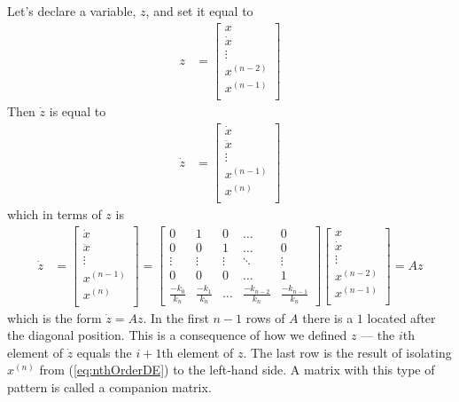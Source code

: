 \documentclass[11pt, oneside]{article}   	%
\begin{document}
Let's declare a variable, $z$, and set it equal to
\begin{align}
z &= \begin{bmatrix}
        x \\
        \dot{x} \\
        \vdots \\
        x^{(n-2)} \\
        x^{(n-1)} \\
      \end{bmatrix}
\end{align}
Then $\dot{z}$ is equal to
\begin{align}
\dot{z} &= \begin{bmatrix}
        \dot{x} \\
        \ddot{x} \\
        \vdots \\
        x^{(n-1)} \\
        x^{(n)} \\
      \end{bmatrix}
\end{align}
which in terms of $z$ is
\begin{align}
\dot{z} &= \begin{bmatrix}
        \dot{x} \\
        \ddot{x} \\
        \vdots \\
        x^{(n-1)} \\
        x^{(n)} \\
      \end{bmatrix}
  =
      \begin{bmatrix}
        0 & 1 & 0 & \dots & 0 \\
        0 & 0 & 1 & \dots & 0 \\
        \vdots & \vdots & \vdots & \ddots & \vdots \\
        0 & 0 & 0 & \dots & 1 \\
        \frac{-k_0}{k_n} & \frac{-k_1}{k_n} & \dots & \frac{-k_{n-2}}{k_n} & \frac{-k_{n-1}}{k_n}
      \end{bmatrix}
      \begin{bmatrix}
        x \\
        \dot{x} \\
        \vdots \\
        x^{(n-2)} \\
        x^{(n-1)} \\
      \end{bmatrix}
  = Az
\end{align}
which is the form $\dot{z} = Az$.
In the first $n-1$ rows of $A$ there is a $1$ located after the diagonal position.
This is a consequence of how we defined $z$ --- the $i$th element of $\dot{z}$ equals the $i+1$th element of $z$.
The last row is the result of isolating $x^{(n)}$ from (\ref*{eq:nthOrderDE}) to the left-hand side.
A matrix with this type of pattern is called a companion matrix.
\end{document}
